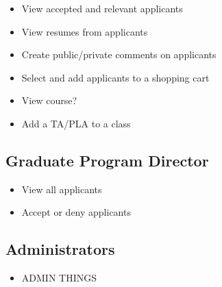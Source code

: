 \documentclass[11pt]{amsart}
\begin{document}
\begin{itemize}
    \item{View accepted and relevant applicants}
    \item{View resumes from applicants}
    \item{Create public/private comments on applicants}
    \item{Select and add applicants to a shopping cart}
    \item{View course?}
    \item{Add a TA/PLA to a class}
\end{itemize}

\subsection{Graduate Program Director}

\begin{itemize}
    \item{View all applicants}
    \item{Accept or deny applicants}
\end{itemize}

\subsection{Administrators}

\begin{itemize}
    \item{ADMIN THINGS}
\end{itemize}
\end{document}
